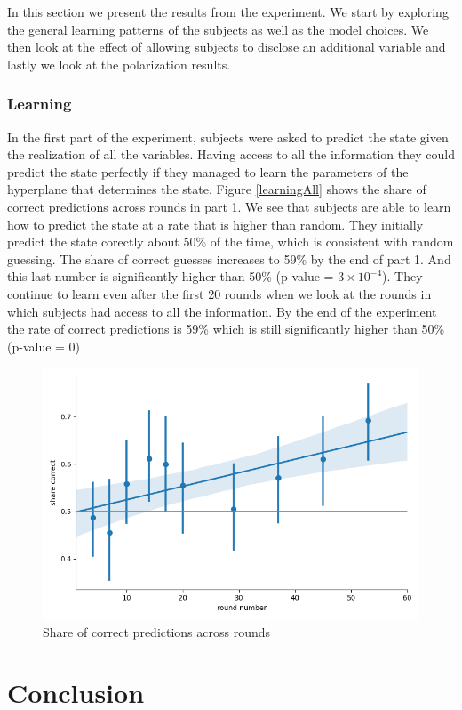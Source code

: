 \documentclass[
  12pt,
]{article}
\begin{document}
In this section we present the results from the experiment. We start by
exploring the general learning patterns of the subjects as well as the
model choices. We then look at the effect of allowing subjects to
disclose an additional variable and lastly we look at the polarization
results.

\hypertarget{learning}{%
\subsubsection{Learning}\label{learning}}

In the first part of the experiment, subjects were asked to predict the
state given the realization of all the variables. Having access to all
the information they could predict the state perfectly if they managed
to learn the parameters of the hyperplane that determines the state.
Figure \ref{learningAll} shows the share of correct predictions across
rounds in part 1. We see that subjects are able to learn how to predict
the state at a rate that is higher than random. They initially predict
the state corectly about 50\% of the time, which is consistent with
random guessing. The share of correct guesses increases to 59\% by the
end of part 1. And this last number is significantly higher than 50\%
(p-value = \ensuremath{3\times 10^{-4}}). They continue to learn even
after the first 20 rounds when we look at the rounds in which subjects
had access to all the information. By the end of the experiment the rate
of correct predictions is 59\% which is still significantly higher than
50\% (p-value = 0)

\begin{figure}

{\centering \includegraphics[width=0.5\linewidth]{../computed_objects/figures/learning_all} 

}

\caption{\label{learningAll} Share of correct predictions across rounds}\label{fig:learningAll}
\end{figure}

\hypertarget{conclusion}{%
\section{Conclusion}\label{conclusion}}

\renewcommand\refname{Appendix}
  
\end{document}
